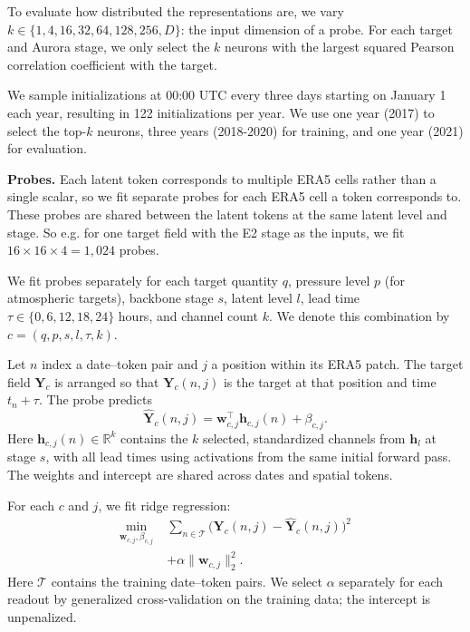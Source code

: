 \documentclass{article}
\theoremstyle{plain}
\theoremstyle{definition}
\begin{document}
To evaluate how distributed the representations are, we vary $k \in \{1,4,16,32,64,128,256,D\}$: the input dimension of a probe. For each target and Aurora stage, we only select the $k$ neurons with the largest squared Pearson correlation coefficient with the target.

We sample initializations at 00:00 UTC every three days starting on January 1 each year, resulting in 122 initializations per year. We use one year (2017) to select the top-$k$ neurons, three years (2018-2020) for training, and one year (2021) for evaluation.

\textbf{Probes.} Each latent token corresponds to multiple ERA5 cells rather than a single scalar, so we fit separate probes for each ERA5 cell a token corresponds to. These probes are shared between the latent tokens at the same latent level and stage. So e.g. for one target field with the E2 stage as the inputs, we fit $16 \times 16 \times 4 = 1,024$ probes.

We fit probes separately for each target quantity $q$, pressure level $p$ (for atmospheric targets), backbone stage $s$, latent level $l$, lead time $\tau \in \{0,6,12,18,24\}$ hours, and channel count $k$. We denote this combination by $c=(q,p,s,l,\tau,k)$.

Let $n$ index a date--token pair and $j$ a position within its ERA5 patch. The target field $\mathbf{Y}_c$ is arranged so that $\mathbf{Y}_c(n,j)$ is the target at that position and time $t_n+\tau$. The probe predicts
\begin{equation}
  \widehat{\mathbf{Y}}_c(n,j)
  = \mathbf{w}_{c,j}^{\top}\mathbf{h}_{c,j}(n)+\beta_{c,j}.
\end{equation}
Here $\mathbf{h}_{c,j}(n)\in\mathbb{R}^k$ contains the $k$ selected, standardized channels from $\mathbf{h}_l$ at stage $s$, with all lead times using activations from the same initial forward pass. The weights and intercept are shared across dates and spatial tokens.

For each $c$ and $j$, we fit ridge regression:
\begin{equation} \label{eq:ridge}
  \begin{aligned}
    \min_{\mathbf{w}_{c,j},\beta_{c,j}}\;&
    \sum_{n\in\mathcal{T}}
    \bigl(\mathbf{Y}_c(n,j)-\widehat{\mathbf{Y}}_c(n,j)\bigr)^2 \\
    &+\alpha\lVert\mathbf{w}_{c,j}\rVert_2^2.
  \end{aligned}
\end{equation}
Here $\mathcal{T}$ contains the training date--token pairs. We select $\alpha$ separately for each readout by generalized cross-validation on the training data; the intercept is unpenalized.
\end{document}
